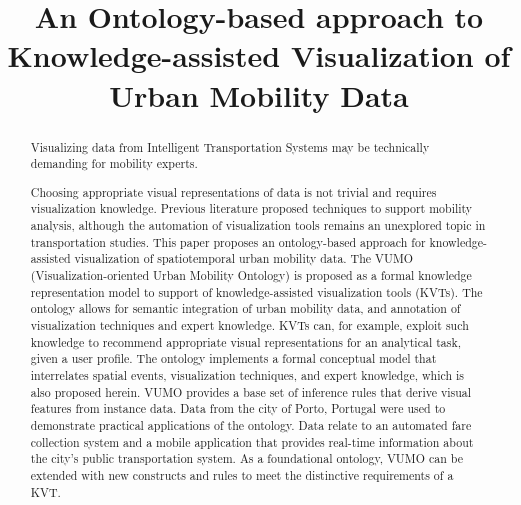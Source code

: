 \documentclass[]{interact}
\theoremstyle{plain}%
\theoremstyle{definition}
\theoremstyle{remark}
\theoremstyle{definition}
\begin{document}

\title{An Ontology-based approach to Knowledge-assisted Visualization of Urban Mobility Data}

\author{
}

\maketitle

\begin{abstract}
Visualizing data from Intelligent Transportation Systems may be technically demanding for mobility experts. 

Choosing appropriate visual representations of data is not trivial and requires visualization knowledge. Previous literature proposed techniques to support mobility analysis, although the automation of visualization tools remains an unexplored topic in transportation studies. This paper proposes an ontology-based approach for knowledge-assisted visualization of spatiotemporal urban mobility data. The VUMO (Visualization-oriented Urban Mobility Ontology) is proposed as a formal knowledge representation model to support of knowledge-assisted visualization tools (KVTs). The ontology allows for semantic integration of urban mobility data, and annotation of visualization techniques and expert knowledge. KVTs can, for example, exploit such knowledge to recommend appropriate visual representations for an analytical task, given a user profile. The ontology implements a formal conceptual model that interrelates spatial events, visualization techniques, and expert knowledge, which is also proposed herein. VUMO provides a base set of inference rules that derive visual features from instance data. Data from the city of Porto, Portugal were used to demonstrate practical applications of the ontology. Data relate to an automated fare collection system and a mobile application that provides real-time information about the city's public transportation system. As a foundational ontology, VUMO can be extended with new constructs and rules to meet the distinctive requirements of a KVT.
\end{abstract}
\end{document}
